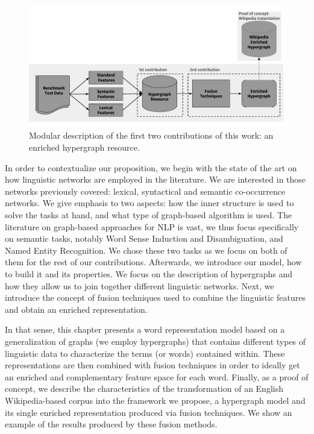 \begin{figure}
\centering
\includegraphics[width=1\linewidth]{./images/Chapitre3/main_diag_p1.pdf}
\caption{Modular description of the first two contributions of this work: an enriched hypergraph resource.}
\label{fig:maindiag}
\end{figure}

In order to contextualize our proposition, we begin with the state of the art on how linguistic networks are employed in the literature. We are interested in those networks previously covered: lexical, syntactical and semantic co-occurrence networks. We give emphasis to two aspects: how the inner structure is used to solve the tasks at hand, and what type of graph-based algorithm is used. The literature on graph-based approaches for NLP is vast, we thus focus specifically on semantic tasks, notably Word Sense Induction and Disambiguation, and Named Entity Recognition. We chose these two tasks as we focus on both of them for the rest of our contributions. Afterwards, we introduce our model, how to build it  and its properties. We focus on the description of hypergraphs and how they allow us to join together different linguistic networks. Next, we introduce the concept of fusion techniques used to combine the linguistic features and obtain an enriched representation.

In that sense, this chapter presents a word representation model based on a generalization of graphs (we employ hypergraphs) that contains different types of linguistic data to characterize the terms (or words) contained within.  These representations are then combined with fusion techniques in order to ideally get an enriched and complementary feature space for each word. Finally, as a proof of concept, we describe the characteristics of the transformation of an English Wikipedia-based corpus into the framework we propose, a hypergraph model and its single enriched representation produced via fusion techniques. We show an example of the results produced by these fusion methods.

